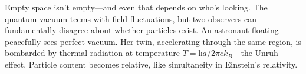 Empty space isn't empty—and even that depends on who's looking. The quantum vacuum teems with field fluctuations, but two observers can fundamentally disagree about whether particles exist. An astronaut floating peacefully sees perfect vacuum. Her twin, accelerating through the same region, is bombarded by thermal radiation at temperature $T = ħa/2πck_B$—the Unruh effect. Particle content becomes relative, like simultaneity in Einstein's relativity.

